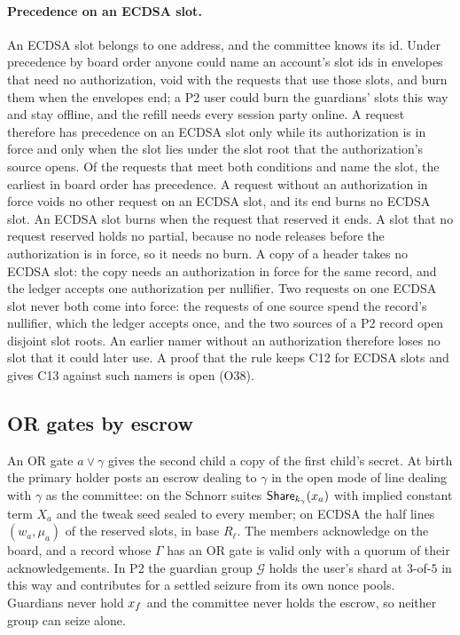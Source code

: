 \paragraph{Precedence on an ECDSA slot.} An ECDSA slot belongs to one address, and the committee knows its id. Under precedence by board order anyone could name an account's slot ids in envelopes that need no authorization, void with  the requests that use those slots, and burn them when the envelopes end; a P2 user could burn the guardians' slots this way and stay offline, and the refill needs every session party online. A request therefore has precedence on an ECDSA slot only while its authorization is in force and only when the slot lies under the slot root that the authorization's source opens. Of the requests that meet both conditions and name the slot, the earliest in board order has precedence. A request without an authorization in force voids no other request on an ECDSA slot, and its end burns no ECDSA slot. An ECDSA slot burns when the request that reserved it ends. A slot that no request reserved holds no partial, because no node releases before the authorization is in force, so it needs no burn. A copy of a header takes no ECDSA slot: the copy needs an authorization in force for the same record, and the ledger accepts one authorization per nullifier. Two requests on one ECDSA slot never both come into force: the requests of one source spend the record's nullifier, which the ledger accepts once, and the two sources of a P2 record open disjoint slot roots. An earlier namer without an authorization therefore loses no slot that it could later use. A proof that the rule keeps C12 for ECDSA slots and gives C13 against such namers is open (O38).

\subsection{OR gates by escrow}\label{sec:or}

An OR gate $a \vee \gamma$ gives the second child a copy of the first child's secret. At birth the primary holder posts an escrow dealing to $\gamma$ in the open mode of line dealing with $\gamma$ as the committee: on the Schnorr suites $\mathsf{Share}_{k_\gamma}(x_a)$ with implied constant term $X_a$ and the tweak seed sealed to every member; on ECDSA the half lines $(w_a, \mu_a)$ of the reserved slots, in base $R_\ell$. The members acknowledge on the board, and a record whose $\Gamma$ has an OR gate is valid only with a quorum of their acknowledgements. In P2 the guardian group $\mathcal{G}$ holds the user's shard at $3$-of-$5$ in this way and contributes for a settled seizure from its own nonce pools. Guardians never hold $x_{f}$ and the committee never holds the escrow, so neither group can seize alone.

